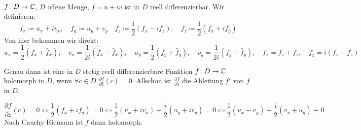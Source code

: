 \\
$ f\colon D\rightarrow\mathbb{C} $, $ D $ offene Menge, $ f=u+iv $ ist in $ D $ reell differenzierbar. Wir definieren:
\[ f_x\coloneqq u_x+iv_x,\quad f_y\coloneqq u_y+v_y\quad f_z\coloneqq\frac{1}{2}(f_x-if_z),\quad f_{\bar z}\coloneqq\frac{1}{2}(f_x+if_y) \]
Von hier bekommen wir direkt:
\[ u_x=\frac{1}{2}(f_x+\bar f_x),\quad v_x=\frac{1}{2i}(f_x-\bar f_x),\quad u_y=\frac{1}{2}(f_y+\bar f_y),\quad v_y=\frac{1}{2i}(f_y-\bar f_y),\quad f_x=f_z+f_{\bar z},\quad f_y=i(f_z-f_{\bar z}) \]
\begin{satz}
	Genau dann ist eine in $ D $ stetig reell differenzierbare Funktion $ f\colon D\rightarrow \mathbb{C} $ holomorph in $ D $, wenn $ \forall c\in D $ $ \frac{\partial f}{\partial \bar z}(c)=0 $. Allschon ist $ \frac{\partial f}{\partial z} $ die Ableitung $ f' $ von $ f $ in $ D $.
\end{satz}
\begin{beweis}
	\[ \frac{\partial f}{\partial\bar z}(c)=0\Leftrightarrow\frac{1}{2}(f_x+if_y)=0\Leftrightarrow\frac{1}{2}(u_x+iv_x)+\frac{i}{2}(u_y+iv_y)=0\Leftrightarrow\frac{1}{2}(u_x-v_y)+\frac{i}{2}(v_x+u_y)\equiv 0 \]
	Nach Cauchy-Riemann ist $ f $ dann holomorph.
\end{beweis}
